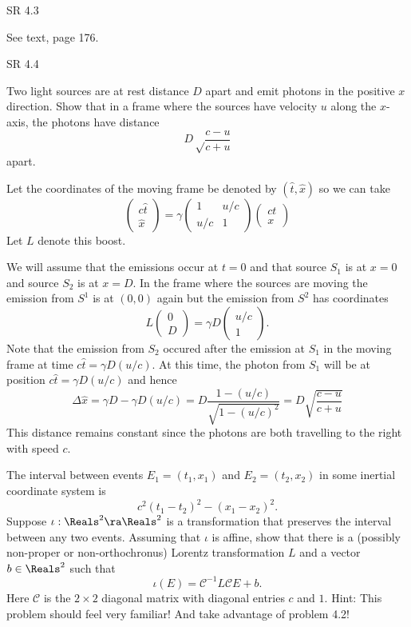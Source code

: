 \documentclass[minion]{homework}
\begin{document}
\begin{aproblems}

\hproblem SR 4.3

See text, page 176.

\hproblem SR 4.4

Two light sources are at rest distance $D$ apart 
and emit photons in the positive
$x$ direction.  Show that in a frame where the sources have velocity
$u$ along the $x$-axis, the photons have distance
\[
D\sqrt\frac{c-u}{c+u}
\]
apart.

\solution
Let the coordinates of the moving frame be denoted by $(\hat t,\hat x)$
so we can take
\[
\begin{pmatrix} c\hat t \\ \hat x\end{pmatrix} = \gamma \begin{pmatrix} 1 & u/c\\
u/c & 1\end{pmatrix} \begin{pmatrix} c t \\ x\end{pmatrix}
\]
Let $L$ denote this boost.

We will assume that the emissions occur at $t=0$ and
that source $S_1$ is at $x=0$ and source $S_2$ is at $x=D$.
In the frame where the sources are moving the emission
from $S^1$ is at $(0,0)$ again but the emission from $S^2$
has coordinates
\[
L \begin{pmatrix}0\\ D\end{pmatrix} 
=\gamma D\begin{pmatrix} u/c\\ 1\end{pmatrix}.
\]
Note that the emission from $S_2$ occured after the emission
at $S_1$ in the moving frame at time $c\hat t = \gamma D  (u/c)$.
At this time, the photon from $S_1$ will be at position
$c\hat t = \gamma D  (u/c)$ and  hence
\[
\Delta \hat x = \gamma D - \gamma D  (u/c) = 
D \frac{1- (u/c)}{\sqrt{1-(u/c)^2}} = D \sqrt{\frac{c-u}{c+u}}
\]
This distance remains constant since the photons are both travelling
to the right with speed $c$.

\hproblem The interval between events $E_1=(t_1,x_1)$ and $E_2=(t_2,x_2)$ in some inertial coordinate
system is
\begin{equation}
c^2(t_1-t_2)^2 - (x_1-x_2)^2.
\end{equation}
Suppose $\iota:\Reals^2\ra\Reals^2$ is a transformation that preserves the interval between any two
events.  Assuming that $\iota$ is affine, show that there is a (possibly non-proper or non-orthochronus) Lorentz transformation $L$ and a vector $b\in \Reals^2$ such that
\begin{equation}
\iota(E) = {\mathcal C}^{-1} L {\mathcal C} E + b.
\end{equation}
Here $\mathcal C$ is the $2\times 2$ diagonal matrix with diagonal entries $c$ and $1$.
Hint: This problem should feel very familiar! And take advantage of problem 4.2!


\end{aproblems}
\end{document}
